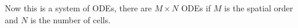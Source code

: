 \documentclass[11pt, oneside]{article}
\begin{document}
  Now this is a system of ODEs, there are $M \times N$ ODEs if $M$ is the spatial
  order and $N$ is the number of cells.
\end{document}
